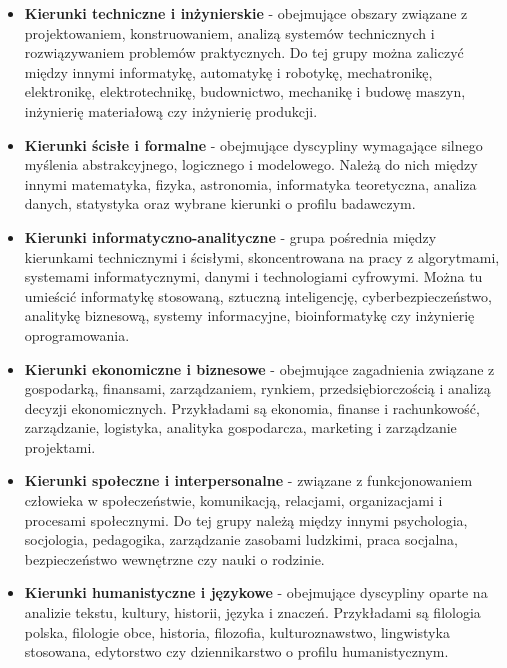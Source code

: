 \documentclass[12pt,a4paper,oneside]{article}
\begin{document}
\begin{itemize}[leftmargin=1.2cm]
    \item \textbf{Kierunki techniczne i inżynierskie} - obejmujące obszary związane z projektowaniem, konstruowaniem, analizą systemów technicznych i rozwiązywaniem problemów praktycznych. Do tej grupy można zaliczyć między innymi informatykę, automatykę i robotykę, mechatronikę, elektronikę, elektrotechnikę, budownictwo, mechanikę i budowę maszyn, inżynierię materiałową czy inżynierię produkcji.

    \item \textbf{Kierunki ścisłe i formalne} - obejmujące dyscypliny wymagające silnego myślenia abstrakcyjnego, logicznego i modelowego. Należą do nich między innymi matematyka, fizyka, astronomia, informatyka teoretyczna, analiza danych, statystyka oraz wybrane kierunki o profilu badawczym.

    \item \textbf{Kierunki informatyczno-analityczne} - grupa pośrednia między kierunkami technicznymi i ścisłymi, skoncentrowana na pracy z algorytmami, systemami informatycznymi, danymi i technologiami cyfrowymi. Można tu umieścić informatykę stosowaną, sztuczną inteligencję, cyberbezpieczeństwo, analitykę biznesową, systemy informacyjne, bioinformatykę czy inżynierię oprogramowania.

    \item \textbf{Kierunki ekonomiczne i biznesowe} - obejmujące zagadnienia związane z gospodarką, finansami, zarządzaniem, rynkiem, przedsiębiorczością i analizą decyzji ekonomicznych. Przykładami są ekonomia, finanse i rachunkowość, zarządzanie, logistyka, analityka gospodarcza, marketing i zarządzanie projektami.

    \item \textbf{Kierunki społeczne i interpersonalne} - związane z funkcjonowaniem człowieka w społeczeństwie, komunikacją, relacjami, organizacjami i procesami społecznymi. Do tej grupy należą między innymi psychologia, socjologia, pedagogika, zarządzanie zasobami ludzkimi, praca socjalna, bezpieczeństwo wewnętrzne czy nauki o rodzinie.

    \item \textbf{Kierunki humanistyczne i językowe} - obejmujące dyscypliny oparte na analizie tekstu, kultury, historii, języka i znaczeń. Przykładami są filologia polska, filologie obce, historia, filozofia, kulturoznawstwo, lingwistyka stosowana, edytorstwo czy dziennikarstwo o profilu humanistycznym.


\end{itemize}
\end{document}
